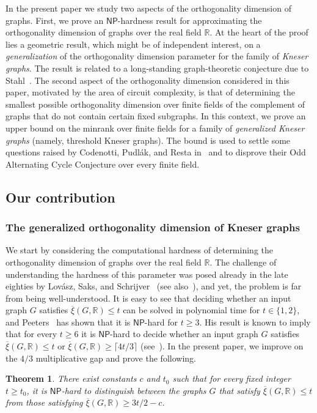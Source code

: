 \documentclass[11pt]{article}
\numberwithin{equation}{section}
\newtheorem{theorem}{Theorem}[section]
\theoremstyle{definition}
\theoremstyle{plain}
\newcommand{\R}{\mathbb R}
\newcommand{\NP}{\mathsf{NP}}
\newcommand{\od}{\overline{\xi}}
\begin{document}
%
In the present paper we study %
two aspects of the orthogonality dimension of graphs.
First, we prove an $\NP$-hardness result for approximating the orthogonality dimension of graphs over the real field $\R$.
At the heart of the proof lies a geometric result, which might be of independent interest, on a \emph{generalization}
of the orthogonality dimension parameter for the family of \emph{Kneser graphs}. The result is related to a long-standing graph-theoretic conjecture due to Stahl~\cite{Stahl76}.
The second aspect of the orthogonality dimension
%
%
considered in this %
paper,  %
motivated by the area of circuit complexity, is that of determining the smallest possible orthogonality dimension  over finite fields of the complement of graphs that do not contain certain fixed subgraphs. In this context, we prove %
an upper bound  %
on the minrank
%
%
over finite fields for 
%
%
a family of \emph{generalized Kneser graphs} (namely, threshold Kneser graphs).
The bound is used to settle %
some %
questions raised by Codenotti, Pudl{\'{a}}k, and Resta in~\cite{CodenottiPR00}
and to disprove their Odd Alternating Cycle Conjecture over every finite field.

\subsection{Our contribution}

\subsubsection{The generalized orthogonality dimension of Kneser graphs}

We start by considering the computational hardness of determining the orthogonality dimension of graphs over the real field $\R$.
The challenge of understanding the hardness of this parameter was posed already in the late eighties by Lov\'asz, Saks, and Schrijver~\cite{LovaszSS89} (see also~\cite[Chapter~10]{LovaszBook}), and yet, the problem is far from being well-understood.
It is easy to see that deciding whether an input graph $G$ satisfies $\od(G,\R) \leq t$ can be solved in polynomial
%
%
time  %
for $t \in \{1,2\}$, and Peeters~\cite{Peeters96} has shown that it is $\NP$-hard for $t \geq 3$.
His result is known to imply that for every $t \geq 6$ it is $\NP$-hard to decide whether an input graph $G$ satisfies $\od(G,\R) \leq t$ or $\od(G,\R) \geq \lceil 4t/3 \rceil$ (see~\cite{HavivMFCS19}).
In the %
present paper,  %
we improve on the $4/3$ multiplicative gap and prove the following.
%
%
%
%
%
%
%
%
\begin{theorem}\label{thm:IntroHardness}
There exist constants $c$ and $t_0$ such that for every fixed integer $t \geq t_0$, it is $\NP$-hard to distinguish between the graphs $G$ that satisfy $\od(G,\R) \leq t$ from those satisfying $\od(G,\R) \geq 3t/2-c$.
\end{theorem}
%
\end{document}
